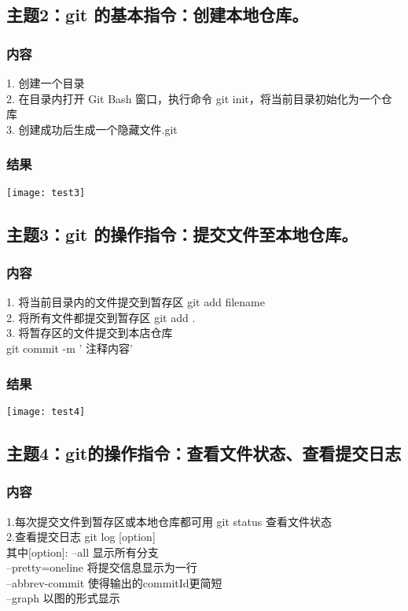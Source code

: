 \documentclass{article}
\begin{document}
\subsection{主题2：git 的基本指令：创建本地仓库。}  
\subsubsection{内容}
1. 创建一个目录\\
2. 在目录内打开 Git Bash 窗口，执行命令 git init，将当前目录初始化为一个仓库\\
3. 创建成功后生成一个隐藏文件.git\\
\subsubsection{结果}   
\texttt{[image: test3]}\\
\subsection{主题3：git 的操作指令：提交文件至本地仓库。}  
\subsubsection{内容}
1. 将当前目录内的文件提交到暂存区 git add filename\\
2. 将所有文件都提交到暂存区 git add .\\
3. 将暂存区的文件提交到本店仓库\\
git commit -m ’ 注释内容’\\
\subsubsection{结果} 
\texttt{[image: test4]}\\ 
\subsection{主题4：git的操作指令：查看文件状态、查看提交日志}  
\subsubsection{内容}
1.每次提交文件到暂存区或本地仓库都可用 git status 查看文件状态\\
2.查看提交日志  git log [option]\\
其中[option]:
--all 显示所有分支\\
--pretty=oneline 将提交信息显示为一行\\
--abbrev-commit 使得输出的commitId更简短\\
--graph 以图的形式显示
\end{document}
